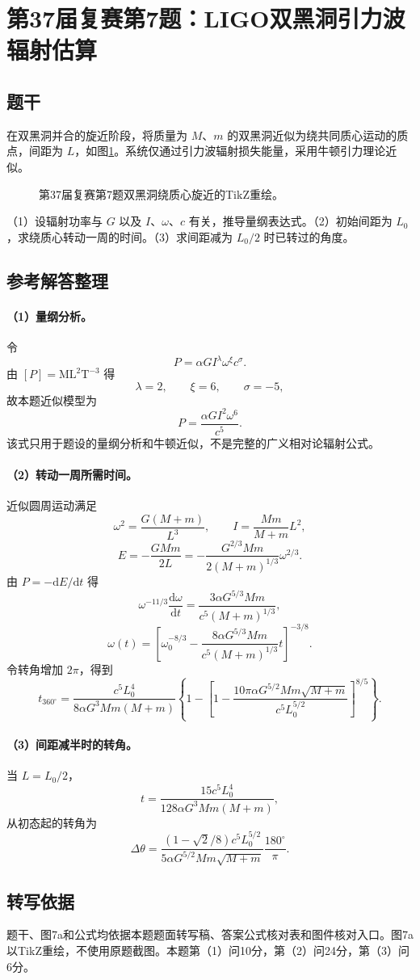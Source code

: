 \section{第37届复赛第7题：LIGO双黑洞引力波辐射估算}
\subsection{题干}
在双黑洞并合的旋近阶段，将质量为 $M$、$m$ 的双黑洞近似为绕共同质心运动的质点，间距为 $L$，如图\ref{fig:cpho37q07}。系统仅通过引力波辐射损失能量，采用牛顿引力理论近似。
\begin{figure}[htbp]\centering

\caption{第37届复赛第7题双黑洞绕质心旋近的TikZ重绘。}\label{fig:cpho37q07}
\end{figure}

（1）设辐射功率与 $G$ 以及 $I$、$\omega$、$c$ 有关，推导量纲表达式。（2）初始间距为 $L_0$，求绕质心转动一周的时间。（3）求间距减为 $L_0/2$ 时已转过的角度。

\subsection{参考解答整理}
\paragraph{（1）量纲分析。} 令
\[
P=\alpha GI^\lambda\omega^\xi c^\sigma.
\]
由 $[P]=\mathrm{ML^2T^{-3}}$ 得
\[
\lambda=2,\qquad \xi=6,\qquad \sigma=-5,
\]
故本题近似模型为
\[
\boxed{P=\frac{\alpha GI^2\omega^6}{c^5}.}
\]
该式只用于题设的量纲分析和牛顿近似，不是完整的广义相对论辐射公式。

\paragraph{（2）转动一周所需时间。} 近似圆周运动满足
\[
\omega^2=\frac{G(M+m)}{L^3},\qquad I=\frac{Mm}{M+m}L^2,
\]
\[
E=-\frac{GMm}{2L}=-\frac{G^{2/3}Mm}{2(M+m)^{1/3}}\omega^{2/3}.
\]
由 $P=-\mathrm dE/\mathrm dt$ 得
\[
\omega^{-11/3}\frac{\mathrm d\omega}{\mathrm dt}=\frac{3\alpha G^{5/3}Mm}{c^5(M+m)^{1/3}},
\]
\[
\omega(t)=\left[\omega_0^{-8/3}-\frac{8\alpha G^{5/3}Mm}{c^5(M+m)^{1/3}}t\right]^{-3/8}.
\]
令转角增加 $2\pi$，得到
\[
\boxed{t_{360^\circ}=\frac{c^5L_0^4}{8\alpha G^3Mm(M+m)}
\left\{1-\left[1-\frac{10\pi\alpha G^{5/2}Mm\sqrt{M+m}}{c^5L_0^{5/2}}\right]^{8/5}\right\}.}
\]

\paragraph{（3）间距减半时的转角。} 当 $L=L_0/2$，
\[
t=\frac{15c^5L_0^4}{128\alpha G^3Mm(M+m)},
\]
从初态起的转角为
\[
\boxed{\Delta\theta=\frac{(1-\sqrt2/8)c^5L_0^{5/2}}{5\alpha G^{5/2}Mm\sqrt{M+m}}\frac{180^\circ}{\pi}.}
\]
\subsection{转写依据}
题干、图7a和公式均依据本题题面转写稿、答案公式核对表和图件核对入口。图7a以TikZ重绘，不使用原题截图。本题第（1）问10分，第（2）问24分，第（3）问6分。
